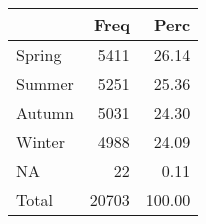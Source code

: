 
\begin{tabular}[t]{lrr}
\toprule
  & Freq & Perc\\
\midrule
Spring & 5411 & 26.14\\
Summer & 5251 & 25.36\\
Autumn & 5031 & 24.30\\
Winter & 4988 & 24.09\\
NA & 22 & 0.11\\
\addlinespace
Total & 20703 & 100.00\\
\bottomrule
\end{tabular}